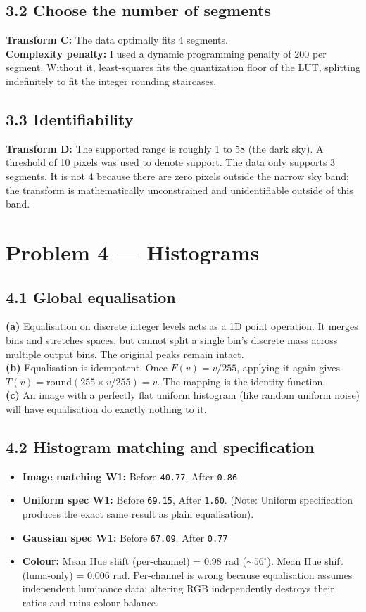 \documentclass[a4paper,11pt]{article}
\begin{document}
\subsection*{3.2 Choose the number of segments}
\textbf{Transform C:} The data optimally fits 4 segments. \\
\textbf{Complexity penalty:} I used a dynamic programming penalty of 200 per segment. Without it, least-squares fits the quantization floor of the LUT, splitting indefinitely to fit the integer rounding staircases.

\subsection*{3.3 Identifiability}
\textbf{Transform D:} The supported range is roughly 1 to 58 (the dark sky). A threshold of 10 pixels was used to denote support. The data only supports 3 segments. It is not 4 because there are zero pixels outside the narrow sky band; the transform is mathematically unconstrained and unidentifiable outside of this band.

\section*{Problem 4 --- Histograms}
\subsection*{4.1 Global equalisation}
\textbf{(a)} Equalisation on discrete integer levels acts as a 1D point operation. It merges bins and stretches spaces, but cannot split a single bin's discrete mass across multiple output bins. The original peaks remain intact. \\
\textbf{(b)} Equalisation is idempotent. Once $F(v) = v/255$, applying it again gives $T(v) = \text{round}(255 \times v/255) = v$. The mapping is the identity function. \\
\textbf{(c)} An image with a perfectly flat uniform histogram (like random uniform noise) will have equalisation do exactly nothing to it.

\subsection*{4.2 Histogram matching and specification}
\begin{itemize}
    \item \textbf{Image matching W1:} Before \texttt{40.77}, After \texttt{0.86}
    \item \textbf{Uniform spec W1:} Before \texttt{69.15}, After \texttt{1.60}. (Note: Uniform specification produces the exact same result as plain equalisation).
    \item \textbf{Gaussian spec W1:} Before \texttt{67.09}, After \texttt{0.77}
    \item \textbf{Colour:} Mean Hue shift (per-channel) = 0.98 rad ($\sim 56^\circ$). Mean Hue shift (luma-only) = 0.006 rad. Per-channel is wrong because equalisation assumes independent luminance data; altering RGB independently destroys their ratios and ruins colour balance.
\end{itemize}
\end{document}
